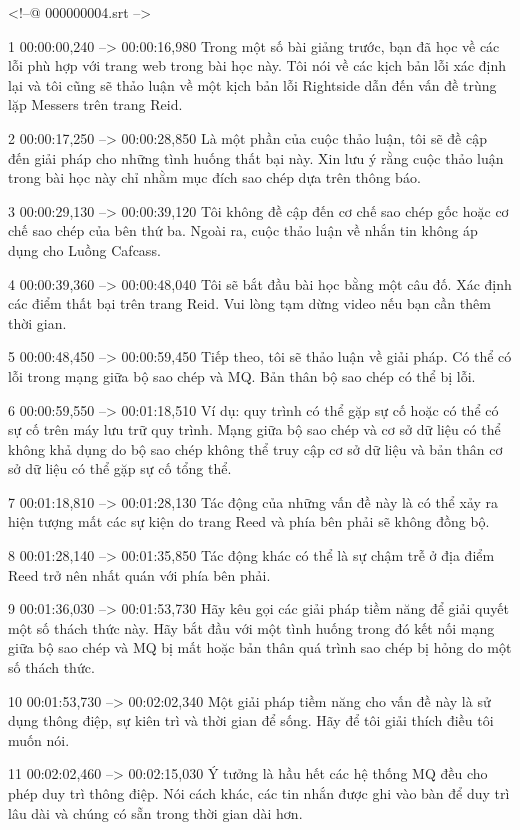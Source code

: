 <!--@ 000000004.srt -->

1
00:00:00,240 --> 00:00:16,980
Trong một số bài giảng trước, bạn đã học về các lỗi phù hợp với trang web trong bài học này. Tôi nói về các kịch bản lỗi xác định lại và tôi cũng sẽ thảo luận về một kịch bản lỗi Rightside dẫn đến vấn đề trùng lặp Messers trên trang Reid.

2
00:00:17,250 --> 00:00:28,850
Là một phần của cuộc thảo luận, tôi sẽ đề cập đến giải pháp cho những tình huống thất bại này.  Xin lưu ý rằng cuộc thảo luận trong bài học này chỉ nhằm mục đích sao chép dựa trên thông báo.

3
00:00:29,130 --> 00:00:39,120
Tôi không đề cập đến cơ chế sao chép gốc hoặc cơ chế sao chép của bên thứ ba.  Ngoài ra, cuộc thảo luận về nhắn tin không áp dụng cho Luồng Cafcass.

4
00:00:39,360 --> 00:00:48,040
Tôi sẽ bắt đầu bài học bằng một câu đố.  Xác định các điểm thất bại trên trang Reid.  Vui lòng tạm dừng video nếu bạn cần thêm thời gian.

5
00:00:48,450 --> 00:00:59,450
Tiếp theo, tôi sẽ thảo luận về giải pháp.  Có thể có lỗi trong mạng giữa bộ sao chép và MQ.  Bản thân bộ sao chép có thể bị lỗi.

6
00:00:59,550 --> 00:01:18,510
Ví dụ: quy trình có thể gặp sự cố hoặc có thể có sự cố trên máy lưu trữ quy trình.  Mạng giữa bộ sao chép và cơ sở dữ liệu có thể không khả dụng do bộ sao chép không thể truy cập cơ sở dữ liệu và bản thân cơ sở dữ liệu có thể gặp sự cố tổng thể.

7
00:01:18,810 --> 00:01:28,130
Tác động của những vấn đề này là có thể xảy ra hiện tượng mất các sự kiện do trang Reed và phía bên phải sẽ không đồng bộ.

8
00:01:28,140 --> 00:01:35,850
Tác động khác có thể là sự chậm trễ ở địa điểm Reed trở nên nhất quán với phía bên phải.

9
00:01:36,030 --> 00:01:53,730
Hãy kêu gọi các giải pháp tiềm năng để giải quyết một số thách thức này.  Hãy bắt đầu với một tình huống trong đó kết nối mạng giữa bộ sao chép và MQ bị mất hoặc bản thân quá trình sao chép bị hỏng do một số thách thức.

10
00:01:53,730 --> 00:02:02,340
Một giải pháp tiềm năng cho vấn đề này là sử dụng thông điệp, sự kiên trì và thời gian để sống.  Hãy để tôi giải thích điều tôi muốn nói.

11
00:02:02,460 --> 00:02:15,030
Ý tưởng là hầu hết các hệ thống MQ đều cho phép duy trì thông điệp.  Nói cách khác, các tin nhắn được ghi vào bàn để duy trì lâu dài và chúng có sẵn trong thời gian dài hơn.

